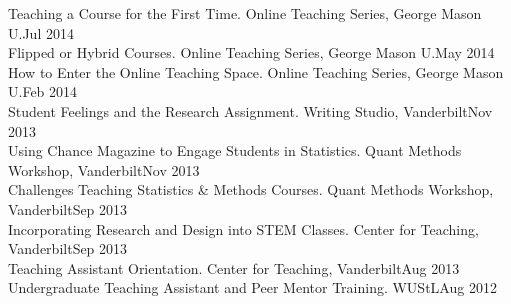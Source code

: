 Teaching a Course for the First Time. Online Teaching Series, George Mason U.\hfill{Jul 2014}\smallskip\\
Flipped or Hybrid Courses. Online Teaching Series, George Mason U.\hfill{May 2014}\smallskip\\
How to Enter the Online Teaching Space. Online Teaching Series, George Mason U.\hfill{Feb 2014}\smallskip\\
Student Feelings and the Research Assignment. Writing Studio, Vanderbilt\hfill{Nov 2013}\smallskip\\
Using Chance Magazine to Engage Students in Statistics. Quant Methods Workshop, Vanderbilt\hfill{Nov 2013}\smallskip\\
Challenges Teaching Statistics \& Methods Courses. Quant Methods Workshop, Vanderbilt\hfill{Sep 2013}\smallskip\\
Incorporating Research and Design into STEM Classes. Center for Teaching, Vanderbilt\hfill{Sep 2013}\smallskip\\
Teaching Assistant Orientation. Center for Teaching, Vanderbilt\hfill{Aug 2013}\smallskip\\
Undergraduate Teaching Assistant and Peer Mentor Training. WUStL\hfill{Aug 2012}
